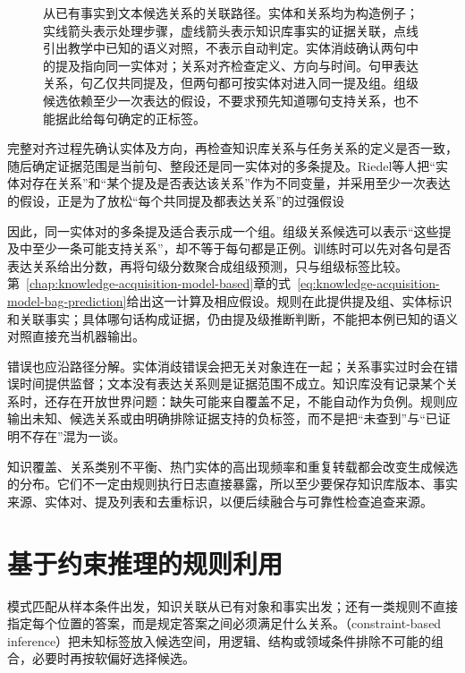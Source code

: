 \begin{figure}[htbp]
  \centering
  
  \caption{从已有事实到文本候选关系的关联路径。实体和关系均为构造例子；实线箭头表示处理步骤，虚线箭头表示知识库事实的证据关联，点线引出教学中已知的语义对照，不表示自动判定。实体消歧确认两句中的提及指向同一实体对；关系对齐检查定义、方向与时间。句甲表达关系，句乙仅共同提及，但两句都可按实体对进入同一提及组。组级候选依赖至少一次表达的假设，不要求预先知道哪句支持关系，也不能据此给每句确定的正标签。}
  \label{fig:rule-based-knowledge-acquisition-relation-path}
\end{figure}

完整对齐过程先确认实体及方向，再检查知识库关系与任务关系的定义是否一致，随后确定证据范围是当前句、整段还是同一实体对的多条提及。Riedel等人把“实体对存在关系”和“某个提及是否表达该关系”作为不同变量，并采用至少一次表达的假设，正是为了放松“每个共同提及都表达关系”的过强假设

因此，同一实体对的多条提及适合表示成一个组。组级关系候选可以表示“这些提及中至少一条可能支持关系”，却不等于每句都是正例。训练时可以先对各句是否表达关系给出分数，再将句级分数聚合成组级预测，只与组级标签比较。第~\ref{chap:knowledge-acquisition-model-based}章的式~\eqref{eq:knowledge-acquisition-model-bag-prediction}给出这一计算及相应假设。规则在此提供提及组、实体标识和关联事实；具体哪句话构成证据，仍由提及级推断判断，不能把本例已知的语义对照直接充当机器输出。

错误也应沿路径分解。实体消歧错误会把无关对象连在一起；关系事实过时会在错误时间提供监督；文本没有表达关系则是证据范围不成立。知识库没有记录某个关系时，还存在开放世界问题：缺失可能来自覆盖不足，不能自动作为负例。规则应输出未知、候选关系或由明确排除证据支持的负标签，而不是把“未查到”与“已证明不存在”混为一谈。

知识覆盖、关系类别不平衡、热门实体的高出现频率和重复转载都会改变生成候选的分布。它们不一定由规则执行日志直接暴露，所以至少要保存知识库版本、事实来源、实体对、提及列表和去重标识，以便后续融合与可靠性检查追查来源。

\section{基于约束推理的规则利用}
\label{sec:rule-based-knowledge-acquisition-constraint}

模式匹配从样本条件出发，知识关联从已有对象和事实出发；还有一类规则不直接指定每个位置的答案，而是规定答案之间必须满足什么关系。（constraint-based inference）把未知标签放入候选空间，用逻辑、结构或领域条件排除不可能的组合，必要时再按软偏好选择候选。

